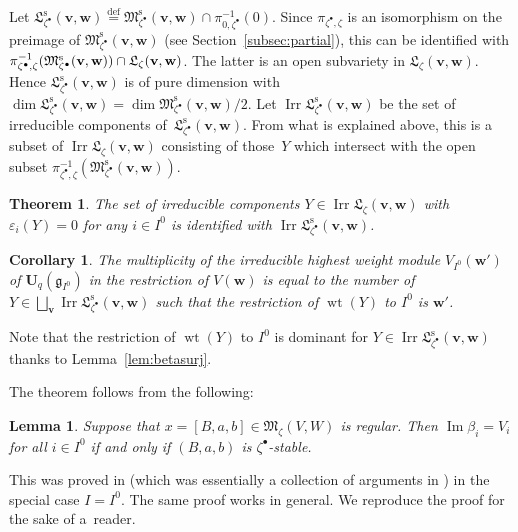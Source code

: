 \documentclass[10pt,a4paper]{amsart}
\newtheorem{Theorem}[equation]{Theorem}
\newtheorem{Corollary}[equation]{Corollary}
\newtheorem{Lemma}[equation]{Lemma}
\theoremstyle{definition}
\numberwithin{equation}{section}
\newcommand{\subsecref}[1]{Section~\ref{#1}}
\newcommand{\defeq}{\overset{\operatorname{\scriptstyle def}}{=}}
\newcommand{\Ima}{\operatorname{Im}}
\newcommand{\M}{{\mathfrak M}} %
\newcommand{\Mreg}{\M^{\operatorname{s}}}
\newcommand{\La}{{\mathfrak L}} %
\newcommand{\bv}{{\mathbf v}} %
\newcommand{\bw}{{\mathbf w}} %
\newcommand{\Un}{{\mathbf U}_q}
\newcommand{\Irr}{\operatorname{Irr}}
\newcommand{\Lareg}{\mathfrak L^{\operatorname{s}}}
\begin{document}
Let
\(
   \Lareg_{\zeta^\bullet}(\bv,\bw) \defeq
   \Mreg_{\zeta^\bullet}(\bv,\bw) \cap \pi_{0,\zeta^\bullet}^{-1}(0).
\)
Since $\pi_{\zeta^\bullet,\zeta}$ is an isomorphism on the preimage of
$\Mreg_{\zeta^\bullet}(\bv,\bw)$ (see \subsecref{subsec:partial}),
this can be identif\/ied with
$\pi_{\zeta^\bullet,\zeta}^{-1}(\Mreg_{\zeta^\bullet}(\bv,\bw))\linebreak[2]
\cap\La_\zeta(\bv,\bw)$. The latter is an open subvariety in
$\La_\zeta(\bv,\bw)$. Hence $\Lareg_{\zeta^\bullet}(\bv,\bw)$ is
of pure dimension with $\dim \Lareg_{\zeta^\bullet}(\bv,\bw)
= \dim \Mreg_{\zeta^\bullet}(\bv,\bw)/2$.
Let
\(
   \Irr \Lareg_{\zeta^\bullet}(\bv,\bw)
\)
be the set of irreducible components of~$\Lareg_{\zeta^\bullet}(\bv,\bw)$.
From what is explained above, this is a subset of
$\Irr\La_\zeta(\bv,\bw)$ consisting of those~$Y$ which intersect with the
open subset $\pi_{\zeta^\bullet,\zeta}^{-1}(\Mreg_{\zeta^\bullet}(\bv,\bw))$.

\begin{Theorem}\label{thm:mult_crystal}
  The set of irreducible components $Y\in\Irr\La_\zeta(\bv,\bw)$ with
  $\varepsilon_i(Y) = 0$ for any $i\in I^0$ is identified with
  $\Irr\Lareg_{\zeta^\bullet}(\bv,\bw)$.
\end{Theorem}

\begin{Corollary}
  The multiplicity of the irreducible highest weight module
  $V_{I^0}(\bw')$ of $\Un(\mathfrak g_{I^0})$ in the restriction of
  $V(\bw)$ is equal to the number of
  $Y\in\bigsqcup_{\bv}
  \Irr\Lareg_{\zeta^\bullet}(\bv,\bw)$ such that the restriction of
  $\operatorname{wt}(Y)$ to $I^0$ is $\bw'$.
\end{Corollary}

Note that the restriction of $\operatorname{wt}(Y)$ to $I^0$ is
dominant for $Y\in\Irr\Lareg_{\zeta^\bullet}(\bv,\bw)$ thanks to Lem\-ma~\ref{lem:betasurj}.

The theorem follows from the following:

\begin{Lemma}
  Suppose that $x = [B,a,b]\in \M_\zeta(V,W)$ is regular. Then $\Ima
  \beta_i = V_i$ for all $i\in I^0$ if and only if $(B,a,b)$ is
  $\zeta^\bullet$-stable.
\end{Lemma}

This was proved in \cite[2.9.4]{Na-qaff} (which was essentially a
collection of arguments in \cite{Na-alg}) in the special case $I =
I^0$. The same proof works in general. We reproduce the proof for the
sake of a~reader.
\end{document}
